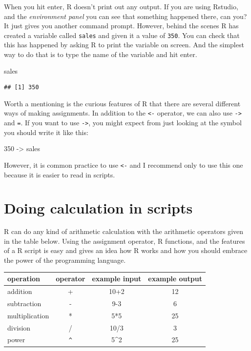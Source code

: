 \documentclass[
  12pt,
  oneside]{book}
\newenvironment{Shaded}{\begin{snugshade}}{\end{snugshade}}
\newcommand{\DecValTok}[1]{\textcolor[rgb]{0.00,0.00,0.81}{#1}}
\newcommand{\NormalTok}[1]{#1}
\newcommand{\OtherTok}[1]{\textcolor[rgb]{0.56,0.35,0.01}{#1}}
\begin{document}
When you hit enter, R doesn't print out any output. If you are using Rstudio, and the \emph{environment panel} you can see that something happened there, can you? It just gives you another command prompt. However, behind the scenes R has created a variable called \texttt{sales} and given it a value of \texttt{350}. You can check that this has happened by asking R to print the variable on screen. And the simplest way to do that is to type the name of the variable and hit enter.

\begin{Shaded}
\begin{Highlighting}[]
\NormalTok{sales}
\end{Highlighting}
\end{Shaded}

\begin{verbatim}
## [1] 350
\end{verbatim}

Worth a mentioning is the curious features of R that there are several different ways of making assignments. In addition to the \texttt{\textless{}-} operator, we can also use \texttt{-\textgreater{}} and \texttt{=}. If you want to use \texttt{-\textgreater{}}, you might expect from just looking at the symbol you should write it like this:

\begin{Shaded}
\begin{Highlighting}[]
\DecValTok{350} \OtherTok{{-}\textgreater{}}\NormalTok{ sales}
\end{Highlighting}
\end{Shaded}

However, it is common practice to use \texttt{\textless{}-} and I recommend only to use this one because it is easier to read in scripts.

\hypertarget{doing-calculation-in-scripts}{%
\section{Doing calculation in scripts}\label{doing-calculation-in-scripts}}

R can do any kind of arithmetic calculation with the arithmetic operators given in the table below. Using the assignment operator, R functions, and the features of a R script is easy and gives an idea how R works and how you should embrace the power of the programming language.

\begin{longtable}[]{@{}lccc@{}}
\toprule\noalign{}
operation & operator & example input & example output \\
\midrule\noalign{}
\endhead
\bottomrule\noalign{}
\endlastfoot
addition & + & 10+2 & 12 \\
subtraction & - & 9-3 & 6 \\
multiplication & * & 5*5 & 25 \\
division & / & 10/3 & 3 \\
power & \texttt{\^{}} & 5\^{}2 & 25 \\
\end{longtable}
\end{document}
